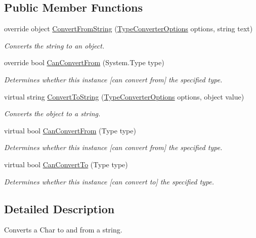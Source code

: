 \subsection*{Public Member Functions}
\begin{DoxyCompactItemize}
\item 
override object \hyperlink{a00046_a7cf201b75714eccdc084b6cc3161bf29}{Convert\-From\-String} (\hyperlink{a00156}{Type\-Converter\-Options} options, string text)
\begin{DoxyCompactList}\small\item\em Converts the string to an object. \end{DoxyCompactList}\item 
override bool \hyperlink{a00046_ab0ccecf34e8ba3710cc61ad643028a34}{Can\-Convert\-From} (System.\-Type type)
\begin{DoxyCompactList}\small\item\em Determines whether this instance \mbox{[}can convert from\mbox{]} the specified type. \end{DoxyCompactList}\item 
virtual string \hyperlink{a00084_a36cb2f9b24f15a671293f3a722324c27}{Convert\-To\-String} (\hyperlink{a00156}{Type\-Converter\-Options} options, object value)
\begin{DoxyCompactList}\small\item\em Converts the object to a string. \end{DoxyCompactList}\item 
virtual bool \hyperlink{a00084_a470d21adaa704eb281250dbd112ff91a}{Can\-Convert\-From} (Type type)
\begin{DoxyCompactList}\small\item\em Determines whether this instance \mbox{[}can convert from\mbox{]} the specified type. \end{DoxyCompactList}\item 
virtual bool \hyperlink{a00084_acb65bd8c8199d88d5b1629ae35d18514}{Can\-Convert\-To} (Type type)
\begin{DoxyCompactList}\small\item\em Determines whether this instance \mbox{[}can convert to\mbox{]} the specified type. \end{DoxyCompactList}\end{DoxyCompactItemize}


\subsection{Detailed Description}
Converts a Char to and from a string. 




